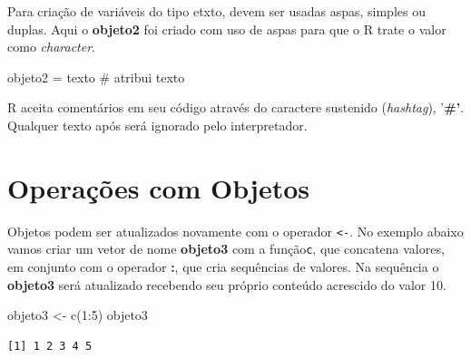 \documentclass[
  letterpaper,
  DIV=11,
  numbers=noendperiod]{scrreprt}
\newenvironment{Shaded}{\begin{snugshade}}{\end{snugshade}}
\newcommand{\CommentTok}[1]{\textcolor[rgb]{0.37,0.37,0.37}{#1}}
\newcommand{\DecValTok}[1]{\textcolor[rgb]{0.68,0.00,0.00}{#1}}
\newcommand{\FunctionTok}[1]{\textcolor[rgb]{0.28,0.35,0.67}{#1}}
\newcommand{\NormalTok}[1]{\textcolor[rgb]{0.00,0.23,0.31}{#1}}
\newcommand{\OtherTok}[1]{\textcolor[rgb]{0.00,0.23,0.31}{#1}}
\newcommand{\SpecialCharTok}[1]{\textcolor[rgb]{0.37,0.37,0.37}{#1}}
\newcommand{\StringTok}[1]{\textcolor[rgb]{0.13,0.47,0.30}{#1}}
\begin{document}
Para criação de variáveis do tipo etxto, devem ser usadas aspas, simples
ou duplas. Aqui o \textbf{objeto2} foi criado com uso de aspas para que
o R trate o valor como \emph{character}.

\begin{Shaded}
\begin{Highlighting}[]
\NormalTok{objeto2 }\OtherTok{=} \StringTok{\textquotesingle{}texto\textquotesingle{}} \CommentTok{\# atribui texto}
\end{Highlighting}
\end{Shaded}

\begin{tcolorbox}[enhanced jigsaw, bottomtitle=1mm, colframe=quarto-callout-note-color-frame, coltitle=black, left=2mm, opacitybacktitle=0.6, opacityback=0, breakable, arc=.35mm, titlerule=0mm, title=\textcolor{quarto-callout-note-color}{\faInfo}\hspace{0.5em}{\# Comentários}, colbacktitle=quarto-callout-note-color!10!white, toptitle=1mm, leftrule=.75mm, bottomrule=.15mm, toprule=.15mm, colback=white, rightrule=.15mm]

R aceita comentários em seu código através do caractere sustenido
(\emph{hashtag}), '\textbf{\#'}. Qualquer texto após será ignorado pelo
interpretador.

\end{tcolorbox}

\hypertarget{operauxe7uxf5es-com-objetos}{%
\section{Operações com Objetos}\label{operauxe7uxf5es-com-objetos}}

Objetos podem ser atualizados novamente com o operador
\texttt{\textless{}-}. No exemplo abaixo vamos criar um vetor de nome
\textbf{objeto3} com a função\texttt{c}, que concatena valores, em
conjunto com o operador \textbf{:}, que cria sequências de valores. Na
sequência o \textbf{objeto3} será atualizado recebendo seu próprio
conteúdo acrescido do valor 10.

\begin{Shaded}
\begin{Highlighting}[]
\NormalTok{objeto3 }\OtherTok{\textless{}{-}} \FunctionTok{c}\NormalTok{(}\DecValTok{1}\SpecialCharTok{:}\DecValTok{5}\NormalTok{)}
\NormalTok{objeto3}
\end{Highlighting}
\end{Shaded}

\begin{verbatim}
[1] 1 2 3 4 5
\end{verbatim}
\end{document}
